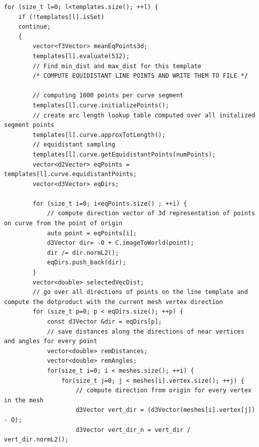 \begin{lstlisting}[label=some-code, caption=Point Projection]
for (size_t l=0; l<templates.size(); ++l) {
    if (!templates[l].isSet)
    continue;
    {
        vector<f3Vector> meanEqPoints3d;
        templates[l].evaluate(512);
        // Find min_dist and max_dist for this template
        /* COMPUTE EQUIDISTANT LINE POINTS AND WRITE THEM TO FILE */ 

        // computing 1000 points per curve segment
        templates[l].curve.initializePoints();
        // create arc length lookup table computed over all initalized segment points
        templates[l].curve.approxTotLength();
        // equidistant sampling
        templates[l].curve.getEquidistantPoints(numPoints);
        vector<d2Vector> eqPoints = templates[l].curve.equidistantPoints;
        vector<d3Vector> eqDirs;

        for (size_t i=0; i<eqPoints.size() ; ++i) {
            // compute direction vector of 3d representation of points on curve from the point of origin
            auto point = eqPoints[i];
            d3Vector dir= -O + C.imageToWorld(point);
            dir /= dir.normL2();
            eqDirs.push_back(dir);
        }
        vector<double> selectedVecDist;
        // go over all directions of points on the line template and compute the dotproduct with the current mesh vertex direction
        for (size_t p=0; p < eqDirs.size(); ++p) {
            const d3Vector &dir = eqDirs[p];
            // save distances along the directions of near vertices and angles for every point
            vector<double> remDistances;
            vector<double> remAngles;
            for(size_t i=0; i < meshes.size(); ++i) {
                for(size_t j=0; j < meshes[i].vertex.size(); ++j) {
                    // compute direction from origin for every vertex in the mesh
                    d3Vector vert_dir = (d3Vector(meshes[i].vertex[j]) - O);
                    d3Vector vert_dir_n = vert_dir / vert_dir.normL2();


\end{lstlisting}

